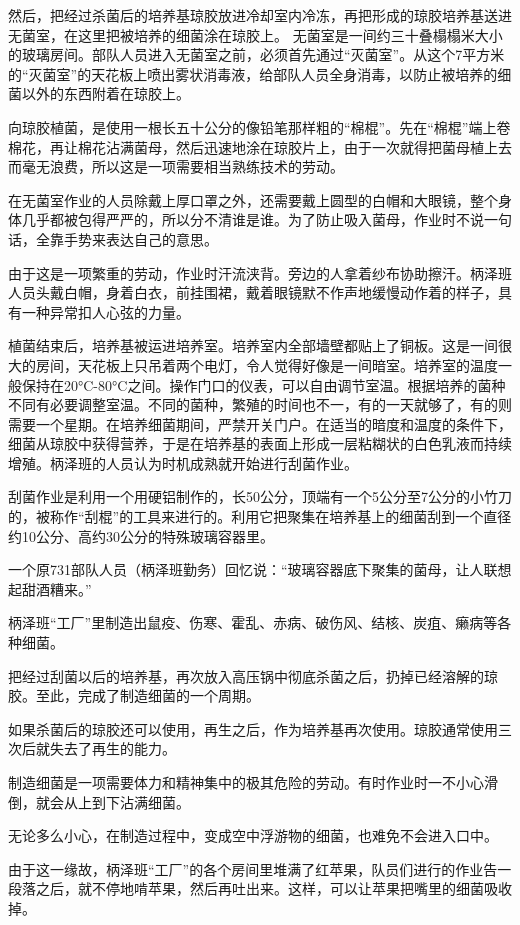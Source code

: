 \documentclass[a4paper,12pt,UTF8,twoside]{ctexbook}
\begin{document}
然后，把经过杀菌后的培养基琼胶放进冷却室内冷冻，再把形成的琼胶培养基送进无菌室，在这里把被培养的细菌涂在琼胶上。
无菌室是一间约三十叠榻榻米大小的玻璃房间。部队人员进入无菌室之前，必须首先通过“灭菌室”。从这个7平方米的“灭菌室”的天花板上喷出雾状消毒液，给部队人员全身消毒，以防止被培养的细菌以外的东西附着在琼胶上。

向琼胶植菌，是使用一根长五十公分的像铅笔那样粗的“棉棍”。先在“棉棍”端上卷棉花，再让棉花沾满菌母，然后迅速地涂在琼胶片上，由于一次就得把菌母植上去而毫无浪费，所以这是一项需要相当熟练技术的劳动。

在无菌室作业的人员除戴上厚口罩之外，还需要戴上圆型的白帽和大眼镜，整个身体几乎都被包得严严的，所以分不清谁是谁。为了防止吸入菌母，作业时不说一句话，全靠手势来表达自己的意思。

由于这是一项繁重的劳动，作业时汗流浃背。旁边的人拿着纱布协助擦汗。柄泽班人员头戴白帽，身着白衣，前挂围裙，戴着眼镜默不作声地缓慢动作着的样子，具有一种异常扣人心弦的力量。

植菌结束后，培养基被运进培养室。培养室内全部墙壁都贴上了铜板。这是一间很大的房间，天花板上只吊着两个电灯，令人觉得好像是一间暗室。培养室的温度一般保持在20°C-80°C之间。操作门口的仪表，可以自由调节室温。根据培养的菌种不同有必要调整室温。不同的菌种，繁殖的时间也不一，有的一天就够了，有的则需要一个星期。在培养细菌期间，严禁开关门户。在适当的暗度和温度的条件下，细菌从琼胶中获得营养，于是在培养基的表面上形成一层粘糊状的白色乳液而持续增殖。柄泽班的人员认为时机成熟就开始进行刮菌作业。

刮菌作业是利用一个用硬铝制作的，长50公分，顶端有一个5公分至7公分的小竹刀的，被称作“刮棍”的工具来进行的。利用它把聚集在培养基上的细菌刮到一个直径约10公分、高约30公分的特殊玻璃容器里。

一个原731部队人员（柄泽班勤务）回忆说：“玻璃容器底下聚集的菌母，让人联想起甜酒糟来。”

柄泽班“工厂”里制造出鼠疫、伤寒、霍乱、赤病、破伤风、结核、炭疽、癞病等各种细菌。

把经过刮菌以后的培养基，再次放入高压锅中彻底杀菌之后，扔掉已经溶解的琼胶。至此，完成了制造细菌的一个周期。

如果杀菌后的琼胶还可以使用，再生之后，作为培养基再次使用。琼胶通常使用三次后就失去了再生的能力。

制造细菌是一项需要体力和精神集中的极其危险的劳动。有时作业时一不小心滑倒，就会从上到下沾满细菌。

无论多么小心，在制造过程中，变成空中浮游物的细菌，也难免不会进入口中。

由于这一缘故，柄泽班“工厂”的各个房间里堆满了红苹果，队员们进行的作业告一段落之后，就不停地啃苹果，然后再吐出来。这样，可以让苹果把嘴里的细菌吸收掉。
\end{document}
